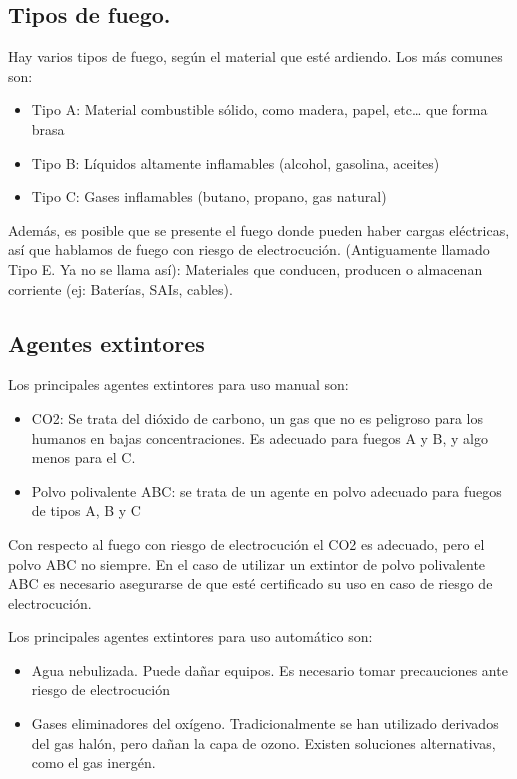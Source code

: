 \documentclass{article}
\begin{document}
\subsection{Tipos de fuego.}
\label{sec:org28926a3}
Hay varios tipos de fuego, según el material que esté ardiendo. Los más comunes son:
\begin{itemize}
\item Tipo A: Material combustible sólido, como madera, papel, etc… que forma brasa
\item Tipo B: Líquidos altamente inflamables (alcohol, gasolina, aceites)
\item Tipo C: Gases inflamables (butano, propano, gas natural)
\end{itemize}

Además, es posible que se presente el fuego donde pueden haber cargas eléctricas, así que hablamos de fuego con riesgo de electrocución. (Antiguamente llamado Tipo E. Ya no se llama así): Materiales que conducen, producen o almacenan corriente (ej: Baterías, SAIs, cables).

\subsection{Agentes extintores}
\label{sec:org52348ed}
Los principales agentes extintores para uso manual son:
\begin{itemize}
\item CO2: Se trata del dióxido de carbono, un gas que no es peligroso para los humanos en bajas concentraciones. Es adecuado para fuegos A y B, y algo menos para el C.
\item Polvo polivalente ABC: se trata de un agente en polvo adecuado para fuegos de tipos A, B y C
\end{itemize}

Con respecto al fuego con riesgo de electrocución el CO2 es adecuado, pero el polvo ABC no siempre. En el caso de utilizar un extintor de polvo polivalente ABC es necesario asegurarse de que esté certificado su uso en caso de riesgo de electrocución.

Los principales agentes extintores para uso automático son:
\begin{itemize}
\item Agua nebulizada. Puede dañar equipos. Es necesario tomar precauciones ante riesgo de electrocución
\item Gases eliminadores del oxígeno. Tradicionalmente se han utilizado derivados del gas halón, pero dañan la capa de ozono. Existen soluciones alternativas, como el gas inergén.
\end{itemize}
\end{document}
